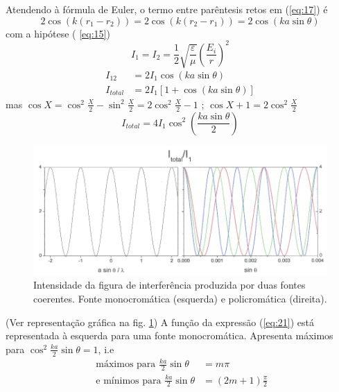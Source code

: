 \documentclass[a4paper,12pt]{article}
\begin{document}
Atendendo à fórmula de Euler, o termo entre parêntesis retos  em (\ref{eq:17}) é 
\begin{equation*}
	2 \cos ( k (r_1 - r_2) ) = 2 \cos ( k (r_2 - r_1) ) = 2 \cos ( k a \sin \theta ) 
\end{equation*}
com a hipótese ( \ref{eq:15}) 
\begin{equation}
	\label{eq:18} I_1= I_2 = \frac{1}{2}\sqrt{\frac{ \varepsilon}{\mu}} (\frac{E_i}{r })^2 
\end{equation}
\begin{align}
	I_{12} &= 2 I_1 \cos ( k a \sin \theta ) \\
	I_{total} &= 2 I_1 \left[ 1 + \cos ( k a \sin \theta ) \right ] 
\end{align}
mas $ \cos X = \cos^2 \frac{X}{2} - \sin^2 \frac{X}{2} = 2 \cos^2 \frac{X}{2} - 1$ ; $ \cos X +1 = 2 \cos^2 \frac{X}{2}$
\begin{equation}
	\label{eq:21} I_{total} = 4 I_1 \cos^2 (\frac{k a \sin \theta }{2} ) 
\end{equation}

\begin{figure}[h!tb]  \centering 
	\includegraphics[width=\textwidth]{figura2} 
	\caption{Intensidade da figura de interferência produzida por duas fontes coerentes. Fonte monocromática (esquerda) e policromática (direita).\label{fig:2}} 
\end{figure}


(Ver representação gráfica na fig. \ref{fig:2})
A função da expressão (\ref{eq:21}) está representada à esquerda para uma fonte monocromática.
Apresenta máximos para $ \cos^2 \frac{k a}{2} \sin \theta = 1 $, i.e
\begin{align}
	\text{ máximos para }\frac{k a}{2} \sin \theta &= m \pi \label{eq:22} \\
	\text{ e mínimos para } \frac{k a}{2} \sin \theta &= (2m +1)\frac{\pi}{2} \label{eq:23} 
\end{align}
\end{document}
